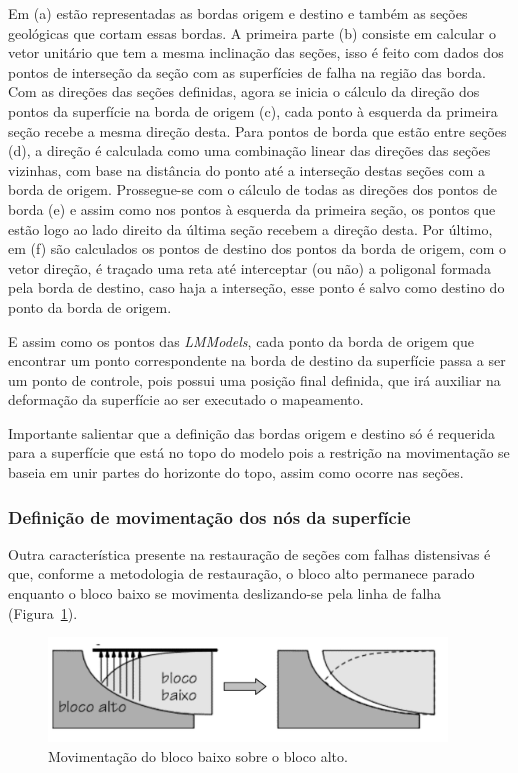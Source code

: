 Em (a) estão representadas as bordas origem e destino e também as seções geológicas que cortam essas bordas. A primeira parte (b) consiste em calcular o vetor unitário que tem a mesma inclinação das seções, isso é feito com dados dos pontos de interseção da seção com as superfícies de falha na região das borda. Com as direções das seções definidas, agora se inicia o cálculo da direção dos pontos da superfície na borda de origem (c), cada ponto à esquerda da primeira seção recebe a mesma direção desta. Para pontos de borda que estão entre seções (d), a direção é calculada como uma combinação linear das direções das seções vizinhas, com base na distância do ponto até a interseção destas seções com a borda de origem. Prossegue-se com o cálculo de todas as direções dos pontos de borda (e) e assim como nos pontos à esquerda da primeira seção, os pontos que estão logo ao lado direito da última seção recebem a direção desta. Por último, em (f) são calculados os pontos de destino dos pontos da borda de origem, com o vetor direção, é traçado uma reta até interceptar (ou não) a poligonal formada pela borda de destino, caso haja a interseção, esse ponto é salvo como destino do ponto da borda de origem.

E assim como os pontos das \textit{LMModels}, cada ponto da borda de origem que encontrar um ponto correspondente na borda de destino da superfície passa a ser um ponto de controle, pois possui uma posição final definida, que irá auxiliar na deformação da superfície ao ser executado o mapeamento.

Importante salientar que a definição das bordas origem e destino só é requerida para a superfície que está no topo do modelo pois a restrição na movimentação se baseia em unir partes do horizonte do topo, assim como ocorre nas seções.

\subsubsection{Definição de movimentação dos nós da superfície}

Outra característica presente na restauração de seções com falhas distensivas é que, conforme a metodologia de restauração, o bloco alto permanece parado enquanto o bloco baixo se movimenta deslizando-se pela linha de falha (Figura~\ref{fig-hang-foot-wall}).

\begin{figure} [H]
  \begin{center}
    \includegraphics[width=300pt]{images/fig-hang-foot-wall}
    \caption{Movimentação do bloco baixo sobre o bloco alto.\cite{Santi}}\label{fig-hang-foot-wall}
  \end{center}
\end{figure}

